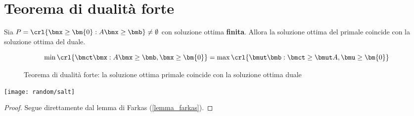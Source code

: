 \documentclass[\main/main.tex]{subfiles}
\begin{document}
\section{Teorema di dualità forte}

\begin{minipage}{\textwidth}
  \begin{minipage}{.83\textwidth}
    \flushleft
    \begin{theorem}
      \label{dualita_forte}
      Sia $P = \crl{\bmx \geq \bm{0}: A\bmx \geq \bmb} \neq \emptyset$ con soluzione ottima \textbf{finita}. Allora la soluzione ottima del primale coincide con la soluzione ottima del duale.

      \begin{figure}
        \[
          \min\crl{\bmct\bmx: A\bmx \geq \bmb, \bmx \geq \bm{0}} = \max\crl{\bmut\bmb: \bmct \geq \bmut A, \bmu \geq \bm{0}}
        \]
        \caption{Teorema di dualità forte: la soluzione ottima primale coincide con la soluzione ottima duale}
      \end{figure}
    \end{theorem}
  \end{minipage}\hfill
  \begin{minipage}{0.15\textwidth}\center
    \texttt{[image: random/salt]}
  \end{minipage}
\end{minipage}

\begin{proof}
  Segue direttamente dal lemma di Farkas (\ref{lemma_farkas}).
\end{proof}
\end{document}
